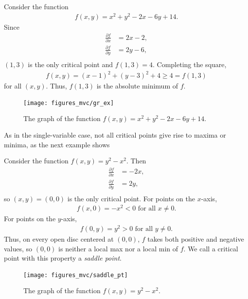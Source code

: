 \documentclass[12pt,letterpaper,reqno]{article}
\numberwithin{equation}{section}
\begin{document}
{\begin{example}
Consider the function 
\begin{align*}
	f(x,y)=x^2+y^2-2x-6y+14.
\end{align*}
Since 
\begin{align*}
	\frac{\partial f}{\partial x}&=2x-2, \\
	\frac{\partial f}{\partial y}&=2y-6, \\
\end{align*}	
$(1,3)$ is the only critical point and $f(1,3)=4$. Completing the square,
\begin{align*}
	f(x,y)=(x-1)^2+(y-3)^2+4 \geq 4=f(1,3)
\end{align*}
for all $(x,y)$. Thus, $f(1,3)$ is the absolute minimum of $f$.
\end{example}

\begin{figure}[h]
	\centering
	\texttt{[image: figures\_mvc/gr\_ex]}
	\caption{The graph of the function $f(x,y)=x^2+y^2-2x-6y+14$.}
\end{figure}


As in the single-variable case, not all critical points give rise to maxima or minima, as the next example shows

\begin{example}
Consider the function $f(x,y)=y^2-x^2$. Then
\begin{align*}
	\frac{\partial f}{\partial x}&=-2x, \\
	\frac{\partial f}{\partial y}&=2y, \\
\end{align*} 	
so $(x,y)=(0,0)$ is the only critical point. For points on the $x$-axis, 
\begin{align*}
	f(x,0)=-x^2<0 \text{ for all } x \neq 0.
\end{align*}
For points on the $y$-axis,
\begin{align*}
	f(0,y)=y^2>0 \text{ for all } y \neq 0.
\end{align*}
Thus, on every open disc centered at $(0,0)$, $f$ takes both positive and negative values, so $(0,0)$ is neither a local max nor a local min of $f$. We call a critical point with this property a \emph{saddle point}.
\end{example}

\begin{figure}[h]
	\centering
	\texttt{[image: figures\_mvc/saddle\_pt]}
	\caption{The graph of the function $f(x,y)=y^2-x^2$.}
\end{figure}

}
\end{document}
